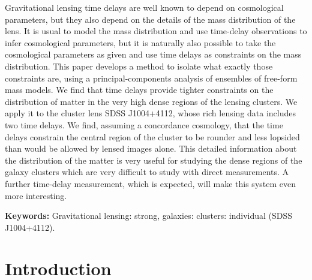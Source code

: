 \documentclass[
  11pt,
  twoside,
  openright,
  titlepage,
  headings=optiontoheadandtoc
]{scrbook}
\begin{document}
\begin{paperabstract}
Gravitational lensing time delays are well known to depend on
cosmological parameters, but they also depend on the details of the
mass distribution of the lens.  It is usual to model the mass
distribution and use time-delay observations to infer cosmological
parameters, but it is naturally also possible to take the cosmological
parameters as given and use time delays as constraints on the mass
distribution.  This paper develops a method to isolate what exactly
those constraints are, using a principal-components analysis of
ensembles of free-form mass models. We find that time delays
provide tighter constraints on the distribution of matter in 
the very high dense regions of the lensing
clusters.   We apply it to the cluster lens
SDSS J1004+4112, whose rich lensing data includes two time delays.  We
find, assuming a concordance cosmology, that the time delays constrain
the central region of the cluster to be rounder and less lopsided than
would be allowed by lensed images alone. This detailed information
about the distribution of the matter is very useful for
studying the dense regions of the galaxy clusters which are very
difficult to study with direct measurements.  A further time-delay
measurement, which is expected, will make this system even more
interesting.
\end{paperabstract}

\vspace{1em}
\noindent\textbf{Keywords:}
Gravitational lensing: strong,
galaxies: clusters: individual (SDSS J1004+4112).
\par
\vspace{1em}

\section{Introduction}
\end{document}
